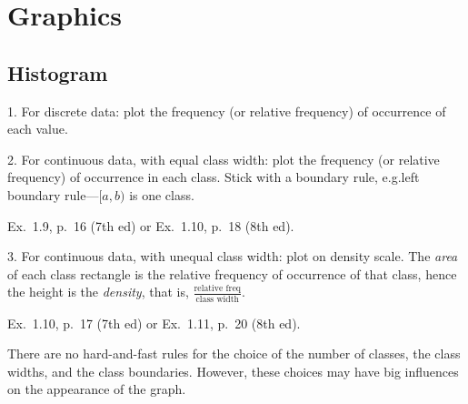 \documentclass[12pt]{article}
\begin{document}
\section{Graphics}

\subsection{Histogram}

1. For discrete data: plot the frequency (or relative frequency) of
occurrence of each value.


2. For continuous data, with equal class width: plot the frequency (or
relative frequency) of occurrence in each class. Stick with a boundary
rule, e.g.\@ left boundary rule---$[a, b)$ is one class.



\example Ex.~1.9, p.~16 (7th ed) or Ex.~1.10, p.~18 (8th ed).

3. For continuous data, with unequal class width: plot on density scale.
The \emph{area} of each class rectangle is the relative frequency of
occurrence of that class, hence the height is the \emph{density},
that is, $\frac{\text{relative freq}}{\text{class width}}$.


\example Ex.~1.10, p.~17 (7th ed) or Ex.~1.11, p.~20 (8th ed).

There are no hard-and-fast rules for the choice
of the number of classes, the class widths, and the class boundaries.
However, these choices may have big influences on the appearance of the graph.
\end{document}
